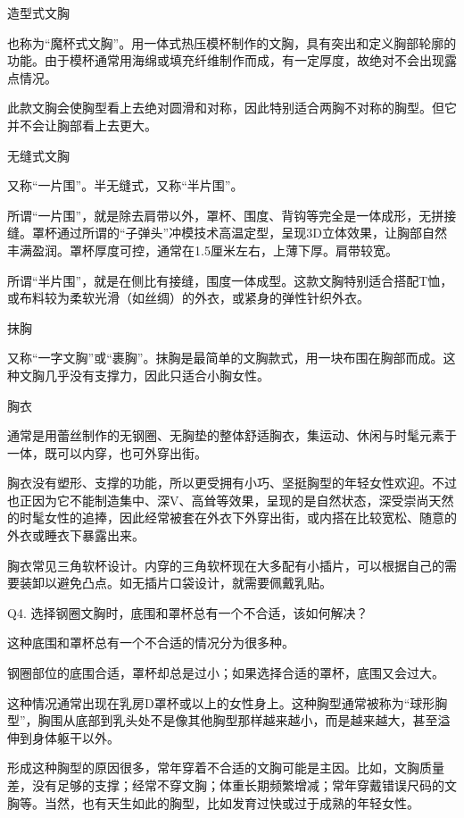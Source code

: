 \documentclass[12pt,UTF8]{ctexbook}
\begin{document}
造型式文胸

也称为“魔杯式文胸”。用一体式热压模杯制作的文胸，具有突出和定义胸部轮廓的功能。由于模杯通常用海绵或填充纤维制作而成，有一定厚度，故绝对不会出现露点情况。

此款文胸会使胸型看上去绝对圆滑和对称，因此特别适合两胸不对称的胸型。但它并不会让胸部看上去更大。

无缝式文胸

又称“一片围”。半无缝式，又称“半片围”。

所谓“一片围”，就是除去肩带以外，罩杯、围度、背钩等完全是一体成形，无拼接缝。罩杯通过所谓的“子弹头”冲模技术高温定型，呈现3D立体效果，让胸部自然丰满盈润。罩杯厚度可控，通常在1.5厘米左右，上薄下厚。肩带较宽。

所谓“半片围”，就是在侧比有接缝，围度一体成型。这款文胸特别适合搭配T恤，或布料较为柔软光滑（如丝绸）的外衣，或紧身的弹性针织外衣。

抹胸

又称“一字文胸”或“裹胸”。抹胸是最简单的文胸款式，用一块布围在胸部而成。这种文胸几乎没有支撑力，因此只适合小胸女性。

胸衣

通常是用蕾丝制作的无钢圈、无胸垫的整体舒适胸衣，集运动、休闲与时髦元素于一体，既可以内穿，也可外穿出街。

胸衣没有塑形、支撑的功能，所以更受拥有小巧、坚挺胸型的年轻女性欢迎。不过也正因为它不能制造集中、深V、高耸等效果，呈现的是自然状态，深受崇尚天然的时髦女性的追捧，因此经常被套在外衣下外穿出街，或内搭在比较宽松、随意的外衣或睡衣下暴露出来。

胸衣常见三角软杯设计。内穿的三角软杯现在大多配有小插片，可以根据自己的需要装卸以避免凸点。如无插片口袋设计，就需要佩戴乳贴。





Q4. 选择钢圈文胸时，底围和罩杯总有一个不合适，该如何解决？


这种底围和罩杯总有一个不合适的情况分为很多种。

钢圈部位的底围合适，罩杯却总是过小；如果选择合适的罩杯，底围又会过大。

这种情况通常出现在乳房D罩杯或以上的女性身上。这种胸型通常被称为“球形胸型”，胸围从底部到乳头处不是像其他胸型那样越来越小，而是越来越大，甚至溢伸到身体躯干以外。

形成这种胸型的原因很多，常年穿着不合适的文胸可能是主因。比如，文胸质量差，没有足够的支撑；经常不穿文胸；体重长期频繁增减；常年穿戴错误尺码的文胸等。当然，也有天生如此的胸型，比如发育过快或过于成熟的年轻女性。
\end{document}
